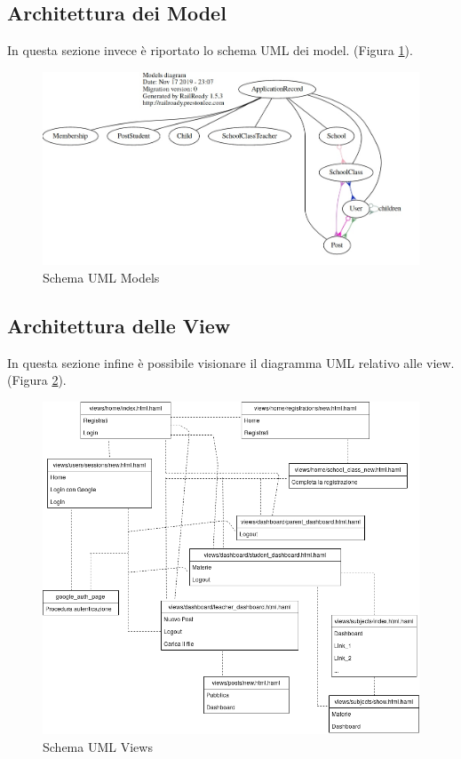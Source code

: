 \documentclass[Lau, binding=0.6cm, oneside]{sapthesis}
\begin{document}
\subsection{Architettura dei Model}

In questa sezione invece è riportato lo schema UML dei model. (Figura \ref{fig:schema_UML_models}).\\

\begin{figure}[H]
	\centering
	\includegraphics[width=1\linewidth]{images/models_UML} 
	\caption{Schema UML Models}
	\label{fig:schema_UML_models}
\end{figure}

\subsection{Architettura delle View}

In questa sezione infine è possibile visionare il diagramma UML relativo alle view. (Figura \ref{fig:UML_views}).

\begin{figure}[H]
	\centering
	\includegraphics[width=1\linewidth]{images/UML_views} 
	\caption{Schema UML Views}
	\label{fig:UML_views}
\end{figure}
\end{document}
